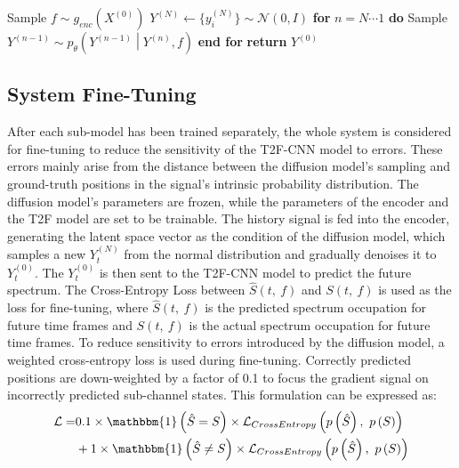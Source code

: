 \documentclass[lettersize,journal]{IEEEtran}
\begin{document}
\begin{algorithm}[H]
\caption{Sampling}\label{alg:alg2}
\begin{algorithmic}
\STATE Sample $ f\sim g_{enc}\left(X^{\left(0\right)}\right) $
\STATE $Y^{\left(N\right)}\gets\{{y}_i^{\left(N\right)}\}\sim\mathcal{N}\left(0,I\right)$
\STATE \textbf{for} $n=N\cdots 1 $ \textbf{do}
\STATE \hspace{0.5cm}Sample $ Y^{\left(n-1\right)}\sim p_\theta\left(Y^{\left(n-1\right)}\middle| Y^{\left(n\right)},f\right)  $
\STATE \textbf{end for}
\STATE \textbf{return}  $ Y^{\left(0\right)} $
\end{algorithmic}
\label{alg2}
\end{algorithm}

\subsection{System Fine-Tuning}
After each sub-model has been trained separately, the whole system is considered for fine-tuning to reduce the sensitivity of the T2F-CNN model to errors. These errors mainly arise from the distance between the diffusion model’s sampling and ground-truth positions in the signal’s intrinsic probability distribution. The diffusion model’s parameters are frozen, while the parameters of the encoder and the T2F model are set to be trainable. The history signal is fed into the encoder, generating the latent space vector as the condition of the diffusion model, which samples a new $Y_t^{\left(N\right)}$ from the normal distribution and gradually denoises it to $Y_t^{\left(0\right)}$. The $Y_t^{\left(0\right)}$ is then sent to the T2F-CNN model to predict the future spectrum. The Cross-Entropy Loss between $\hat{S}\left(t,\ f\right)$ and $S\left(t,\ f\right)$ is used as the loss for fine-tuning, where $\hat{S}\left(t,\ f\right)$ is the predicted spectrum occupation for future time frames and $S\left(t,\ f\right)$ is the actual spectrum occupation for future time frames. To reduce sensitivity to errors introduced by the diffusion model, a weighted cross-entropy loss is used during fine-tuning. Correctly predicted positions are down-weighted by a factor of 0.1 to focus the gradient signal on incorrectly predicted sub-channel states. This formulation can be expressed as:
\begin{equation}
    \begin{aligned}
        \mathcal{L}=&0.1\times\mathbbm{1}\left(\hat{S}=S\right)\times\mathcal{L}_{CrossEntropy}\left(p\left(\hat{S}\right),\ p\left(S\right)\right) \\
        & +1\times\mathbbm{1}\left(\hat{S}\neq S\right)\times\mathcal{L}_{CrossEntropy}\left(p\left(\hat{S}\right),\ p\left(S\right)\right)
    \end{aligned}
\end{equation}
\end{document}
